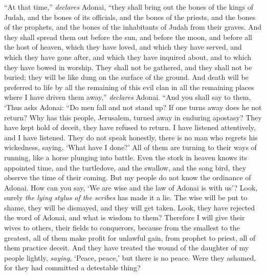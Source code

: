 \begin{biblechapter} %
\verse “At that time,” \textit{declares} Adonai, “they shall bring out the bones of the kings of Judah, and the bones of its officials, and the bones of the priests, and the bones of the prophets, and the bones of the inhabitants of Judah from their graves.
\verse And they shall spread them out before the sun, and before the moon, and before all the host of heaven, which they have loved, and which they have served, and which they have gone after, and which they have inquired about, and to which they have bowed in worship. They shall not be gathered, and they shall not be buried; they will be like dung on the surface of the ground.
\verse And death will be preferred to life by all the remaining of this evil clan in all the remaining places where I have driven them away,” \textit{declares} Adonai.
 “And you shall say to them, ‘Thus asks Adonai:
\verse “Do men fall and not stand up? 
If one turns away does he not return?
\verse Why has this people, Jerusalem, turned away in enduring apostasy? 
They have kept hold of deceit, they have refused to return.
\verse I have listened attentively, 
and I have listened. 
They do not speak honestly, 
there is no man who regrets his wickedness, saying, ‘What have I done?’ 
All of them are turning to their ways of running, 
like a horse plunging into battle.
\verse Even the stork in heaven knows its appointed time, 
and the turtledove, and the swallow, and the song bird, 
they observe the time of their coming. 
But my people do not know the ordinance of Adonai.
\verse How can you say, ‘We are wise and the law of Adonai is with us’? 
Look, surely \textit{the lying stylus of the scribes} has made it a lie.
\verse The wise will be put to shame, 
they will be dismayed, 
and they will get taken. 
Look, they have rejected the word of Adonai, 
and what is wisdom to them?
\verse Therefore I will give their wives to others, 
their fields to conquerors, 
because from the smallest to the greatest, 
all of them make profit for unlawful gain, 
from prophet to priest, 
all of them practice deceit.
\verse And they have treated the wound of the daughter of my people lightly, 
\textit{saying}, ‘Peace, peace,’ but there is no peace.
\verse Were they ashamed, for they had committed a detestable thing? 

\end{biblechapter}
